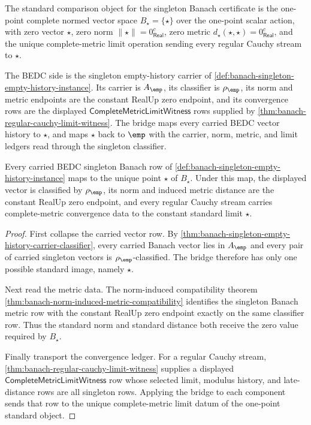 \begin{definition}
\label{def:banach-singleton-standard-bridge-surface}
The standard comparison object for the singleton Banach certificate is the
one-point complete normed vector space $B_{\star}=\{\star\}$ over the one-point
scalar action, with zero vector $\star$, zero norm
$\lVert\star\rVert=0_{\mathsf{Real}}^{c}$, zero metric
$d_{\star}(\star,\star)=0_{\mathsf{Real}}^{c}$, and the unique complete-metric
limit operation sending every regular Cauchy stream to $\star$.

The BEDC side is the singleton empty-history carrier of
\autoref{def:banach-singleton-empty-history-instance}. Its carrier is
$A_{\emp}$, its classifier is $\rho_{\emp}$, its norm and metric endpoints are
the constant RealUp zero endpoint, and its convergence rows are the displayed
$\mathsf{CompleteMetricLimitWitness}$ rows supplied by
\autoref{thm:banach-regular-cauchy-limit-witness}. The bridge maps every
carried BEDC vector history to $\star$, and maps $\star$ back to $\emp$ with
the carrier, norm, metric, and limit ledgers read through the singleton
classifier.
\end{definition}

\begin{theorem}
\label{thm:banach-singleton-standard-bridge-soundness}
Every carried BEDC singleton Banach row of
\autoref{def:banach-singleton-empty-history-instance} maps to the unique point
$\star$ of $B_{\star}$. Under this map, the displayed vector is classified by
$\rho_{\emp}$, its norm and induced metric distance are the constant RealUp
zero endpoint, and every regular Cauchy stream carries complete-metric
convergence data to the constant standard limit $\star$.
\end{theorem}
\begin{proof}
First collapse the carried vector row. By
\autoref{thm:banach-singleton-empty-history-carrier-classifier}, every carried
Banach vector lies in $A_{\emp}$ and every pair of carried singleton vectors is
$\rho_{\emp}$-classified. The bridge therefore has only one possible standard
image, namely $\star$.

Next read the metric data. The norm-induced compatibility theorem
\autoref{thm:banach-norm-induced-metric-compatibility} identifies the
singleton Banach metric row with the constant RealUp zero endpoint exactly on
the same classifier row. Thus the standard norm and standard distance both
receive the zero value required by $B_{\star}$.

Finally transport the convergence ledger. For a regular Cauchy stream,
\autoref{thm:banach-regular-cauchy-limit-witness} supplies a displayed
$\mathsf{CompleteMetricLimitWitness}$ row whose selected limit, modulus
history, and late-distance rows are all singleton rows. Applying the bridge to
each component sends that row to the unique complete-metric limit datum of the
one-point standard object.
\end{proof}

